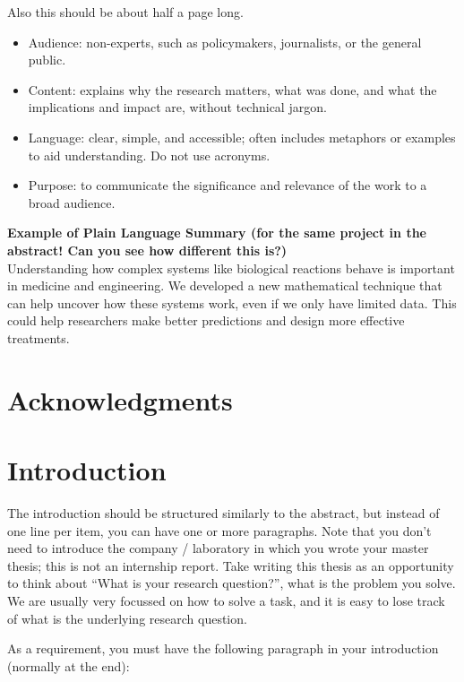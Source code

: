 \documentclass[10pt,a4paper]{article}
\newcommand\blankpage{
    \null
    \thispagestyle{empty}
    \newpage}
\begin{document}
Also this should be about half a page long.

\begin{itemize}
\item Audience: non-experts, such as policymakers, journalists, or the general public.
\item Content: explains why the research matters, what was done, and what the implications and impact are, without technical jargon.
\item Language: clear, simple, and accessible; often includes metaphors or examples to aid understanding. Do not use acronyms.
\item Purpose: to communicate the significance and relevance of the work to a broad audience.
\end{itemize}

\textbf{Example of Plain Language Summary (for the same project in the abstract! Can you see how different this is?)}\\
Understanding how complex systems like biological reactions behave is important in medicine and engineering. We developed a new mathematical technique that can help uncover how these systems work, even if we only have limited data. This could help researchers make better predictions and design more effective treatments.


\newpage
\blankpage

\section*{Acknowledgments}

\newpage
\blankpage

\tableofcontents
\newpage
{}
\section{Introduction}

The introduction should be structured similarly to the abstract, but instead of one line per item, you can have one or more paragraphs.
Note that you don't need to introduce the company / laboratory in which you wrote your master thesis; this is not an internship report.
Take writing this thesis as an opportunity to think about ``What is your research question?'', what is the problem you solve.
We are usually very focussed on how to solve a task, and it is easy to lose track of what is the underlying research question.

As a requirement, you must have the following paragraph in your introduction (normally at the end):
\end{document}
